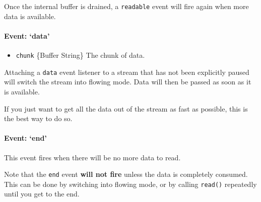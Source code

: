 Once the internal buffer is drained, a \texttt{readable} event will fire
again when more data is available.

\paragraph{\texorpdfstring{Event:
`data'}{Event: data}}\label{event-data}

\begin{itemize}
\itemsep1pt\parskip0pt
\item
  \texttt{chunk} \{Buffer \textbar{} String\} The chunk of data.
\end{itemize}

Attaching a \texttt{data} event listener to a stream that has not been
explicitly paused will switch the stream into flowing mode. Data will
then be passed as soon as it is available.

If you just want to get all the data out of the stream as fast as
possible, this is the best way to do so.

\begin{Shaded}
\end{Shaded}

\paragraph{\texorpdfstring{Event: `end'}{Event: end}}\label{event-end}

This event fires when there will be no more data to read.

Note that the \texttt{end} event \textbf{will not fire} unless the data
is completely consumed. This can be done by switching into flowing mode,
or by calling \texttt{read()} repeatedly until you get to the end.

\begin{Shaded}
\end{Shaded}

